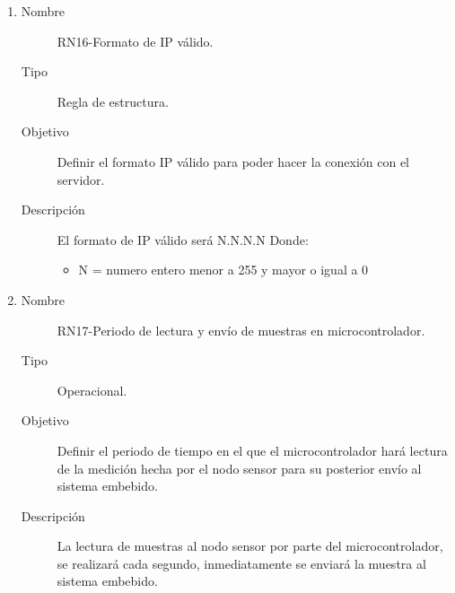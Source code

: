 \begin{enumerate}[label=RN\arabic*.]
\item \label{RN16}
		\begin{description}
			\item[Nombre] RN16-Formato de IP válido.
			\item[Tipo] Regla de estructura.
			\item[Objetivo] Definir el formato IP válido para poder hacer la conexión con el servidor.
			\item[Descripción] El formato de IP válido será N.N.N.N
			Donde:
			\begin{itemize}
		 		\item N = numero entero menor a 255 y mayor o igual a 0
		    \end{itemize}
		\end{description}
		
\item \label{RN17}
		\begin{description}
			\item[Nombre] RN17-Periodo de lectura y envío de muestras en microcontrolador.
			\item[Tipo] Operacional.
			\item[Objetivo] Definir el periodo de tiempo en el que el microcontrolador hará lectura de la medición hecha por el nodo sensor para su posterior envío al sistema embebido.
			\item[Descripción] La lectura de muestras al nodo sensor por parte del microcontrolador, se realizará cada segundo, inmediatamente se enviará la muestra al sistema embebido. 
		\end{description}


\end{enumerate}